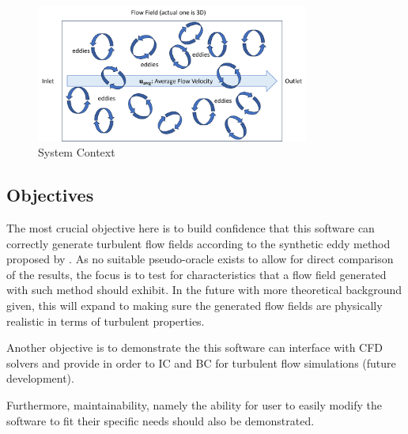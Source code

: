 \documentclass[12pt, titlepage]{article}
\begin{document}
\begin{figure}[h!]
  \begin{center}
   \includegraphics[width=0.8\textwidth]{PS.png}
  \caption{System Context}
  \label{Fig_PhysicalSystem} 
  \end{center}
\end{figure}



\subsection{Objectives}

The most crucial objective here is to build confidence that this software can correctly generate turbulent flow fields according to the synthetic eddy method proposed by \cite{PolettoEtAl2013}. As no suitable pseudo-oracle exists to allow for direct comparison of the results, the focus is to test for characteristics that a flow field generated with such method should exhibit. In the future with more theoretical background given, this will expand to making sure the generated flow fields are physically realistic in terms of turbulent properties. 

Another objective is to demonstrate the this software can interface with CFD solvers and provide in order to IC and BC for turbulent flow simulations (future development).

Furthermore, maintainability, namely the ability for user to easily modify the software to fit their specific needs should also be demonstrated.

\end{document}
